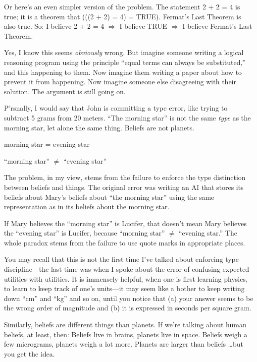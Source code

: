{
 Or here's an even simpler version of the problem.
The statement 2 + 2 = 4 is true; it is a theorem that (((2 + 2) = 4) =
TRUE). Fermat's Last Theorem is also true. So: I
believe 2 + 2 = 4 $\Rightarrow $ I believe TRUE $\Rightarrow $ I
believe Fermat's Last Theorem.}

{
 Yes, I know this seems \textit{obviously} wrong. But imagine
someone writing a logical reasoning program using the principle
``equal terms can always be
substituted,'' and this happening to them. Now
imagine them writing a paper about how to prevent it from happening.
Now imagine someone else disagreeing with their solution. The argument
is still going on.}

{
 P'rsnally, I would say that John is committing a
type error, like trying to subtract 5 grams from 20 meters.
``The morning star'' is not the same
\textit{type} as the morning star, let alone the same thing. Beliefs
are not planets.}

{\centering
 morning star = evening star
\par}


\bigskip

{\centering
 ``morning star'' ${\neq}$
``evening star''
\par}


\bigskip

{
 The problem, in my view, stems from the failure to enforce the
type distinction between beliefs and things. The original error was
writing an AI that stores its beliefs about Mary's
beliefs about ``the morning star''
using the same representation as in its beliefs about the morning
star.}

{
 If Mary believes the ``morning
star'' is Lucifer, that doesn't mean
Mary believes the ``evening star''
is Lucifer, because ``morning star''
${\neq}$ ``evening star.'' The whole
paradox stems from the failure to use quote marks in appropriate
places.}

{
 You may recall that this is not the first time
I've talked about enforcing type discipline---the last
time was when I spoke about the error of confusing expected utilities
with utilities. It is immensely helpful, when one is first learning
physics, to learn to keep track of one's units---it may
seem like a bother to keep writing down
``cm'' and
``kg'' and so on, until you notice
that (a) your answer seems to be the wrong order of magnitude and (b)
it is expressed in seconds per square gram.}

{
 Similarly, beliefs are different things than planets. If
we're talking about human beliefs, at least, then:
Beliefs live in brains, planets live in space. Beliefs weigh a few
micrograms, planets weigh a lot more. Planets are larger than beliefs
\ldots but you get the idea.}

